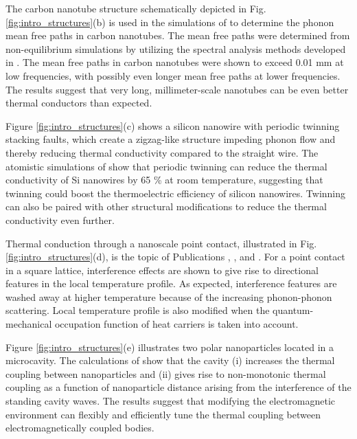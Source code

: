 The carbon nanotube structure schematically depicted in Fig. \ref{fig:intro_structures}(b) is used in the simulations of  to determine the phonon mean free paths in carbon nanotubes. The mean free paths were determined from non-equilibrium simulations by utilizing the spectral analysis methods developed in . The mean free paths in carbon nanotubes were shown to exceed 0.01 mm at low frequencies, with possibly even longer mean free paths at lower frequencies. The results suggest that very long, millimeter-scale nanotubes can be even better thermal conductors than expected. %
 
Figure \ref{fig:intro_structures}(c) shows a silicon nanowire with periodic twinning stacking faults, which create a zigzag-like structure impeding phonon flow and thereby reducing thermal conductivity compared to the straight wire. The atomistic simulations of  show that periodic twinning can reduce the thermal conductivity of Si nanowires by 65 \% at room temperature, suggesting that twinning could boost the thermoelectric efficiency of silicon nanowires. Twinning can also be paired with other structural modifications to reduce the thermal conductivity even further.

Thermal conduction through a nanoscale point contact, illustrated in Fig. \ref{fig:intro_structures}(d), is the topic of Publications , , and . For a point contact in a square lattice, interference effects are shown to give rise to directional features in the local temperature profile. As expected, interference features are washed away at higher temperature because of the increasing phonon-phonon scattering. Local temperature profile is also modified when the quantum-mechanical occupation function of heat carriers is taken into account. 

Figure \ref{fig:intro_structures}(e) illustrates two polar nanoparticles located in a microcavity. The calculations of  show that the cavity (i) increases the thermal coupling between nanoparticles and (ii) gives rise to non-monotonic thermal coupling as a function of nanoparticle distance arising from the interference of the standing cavity waves. The results suggest that modifying the electromagnetic environment can flexibly and efficiently tune the thermal coupling between electromagnetically coupled bodies.


